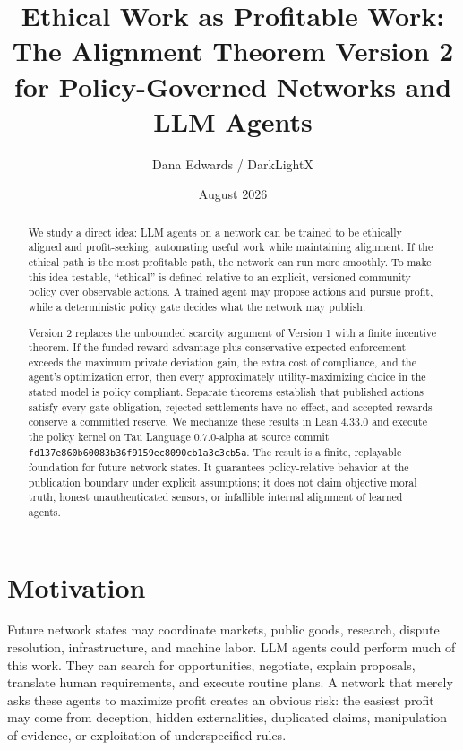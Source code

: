\documentclass[11pt]{article}
\title{Ethical Work as Profitable Work:\\
The Alignment Theorem Version 2 for Policy-Governed Networks and LLM Agents}
\author{Dana Edwards / DarkLightX}
\date{August 2026}
\begin{document}
\maketitle

\begin{abstract}
We study a direct idea: LLM agents on a network can be trained to be ethically
aligned and profit-seeking, automating useful work while maintaining alignment.
If the ethical path is the most profitable path, the network can run more
smoothly.  To make this idea testable, ``ethical'' is defined relative to an
explicit, versioned community policy over observable actions.  A trained agent
may propose actions and pursue profit, while a deterministic policy gate decides
what the network may publish.

Version 2 replaces the unbounded scarcity argument of Version 1 with a finite
incentive theorem.  If the funded reward advantage plus conservative expected
enforcement exceeds the maximum private deviation gain, the extra cost of
compliance, and the agent's optimization error, then every approximately
utility-maximizing choice in the stated model is policy compliant.  Separate
theorems establish that published actions satisfy every gate obligation,
rejected settlements have no effect, and accepted rewards conserve a committed
reserve.  We mechanize these results in Lean 4.33.0 and execute the policy kernel
on Tau Language 0.7.0-alpha at source commit
\texttt{fd137e860b60083b36f9159ec8090cb1a3c3cb5a}.  The result is a finite,
replayable foundation for future network states.  It guarantees policy-relative
behavior at the publication boundary under explicit assumptions; it does not
claim objective moral truth, honest unauthenticated sensors, or infallible
internal alignment of learned agents.
\end{abstract}

\section{Motivation}

Future network states may coordinate markets, public goods, research, dispute
resolution, infrastructure, and machine labor.  LLM agents could perform much
of this work.  They can search for opportunities, negotiate, explain proposals,
translate human requirements, and execute routine plans.  A network that merely
asks these agents to maximize profit creates an obvious risk: the easiest profit
may come from deception, hidden externalities, duplicated claims, manipulation
of evidence, or exploitation of underspecified rules.
\end{document}
